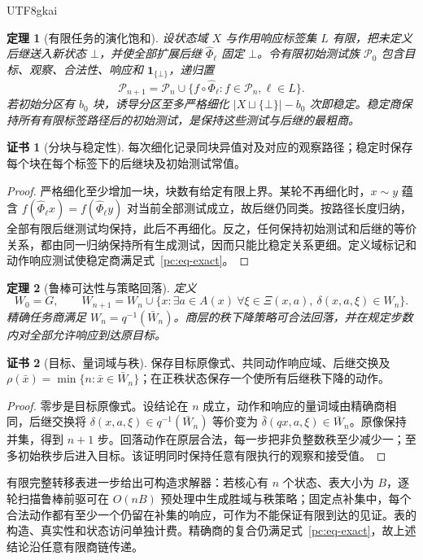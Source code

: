 \documentclass[11pt,a4paper]{article}
\theoremstyle{plain}
\newtheorem{theorem}{定理}[section]
\theoremstyle{definition}
\newtheorem*{certificate}{证书}
\theoremstyle{remark}
\begin{document}
\begin{CJK*}{UTF8}{gkai}
\begin{theorem}[有限任务的演化饱和]
\label{pc:saturation}
设状态域 $X$ 与作用响应标签集 $L$ 有限，把未定义后继送入新状态 $\bot$，并使全部扩展后继 $\widehat\Phi_\ell$ 固定 $\bot$。令有限初始测试族 $\mathcal P_0$ 包含目标、观察、合法性、响应和 $\mathbf1_{\{\bot\}}$，递归置
\[
 \mathcal P_{n+1}=\mathcal P_n\cup
 \{f\circ\widehat\Phi_\ell:f\in\mathcal P_n,\ell\in L\}.
\]
若初始分区有 $b_0$ 块，诱导分区至多严格细化 $|X\sqcup\{\bot\}|-b_0$ 次即稳定。稳定商保持所有有限标签路径后的初始测试，是保持这些测试与后继的最粗商。
\end{theorem}
\begin{certificate}[分块与稳定性]
每次细化记录同块异值对及对应的观察路径；稳定时保存每个块在每个标签下的后继块及初始测试常值。
\end{certificate}
\begin{proof}
严格细化至少增加一块，块数有给定有限上界。某轮不再细化时，$x\sim y$ 蕴含 $f(\widehat\Phi_\ell x)=f(\widehat\Phi_\ell y)$ 对当前全部测试成立，故后继仍同类。按路径长度归纳，全部有限后继测试均保持，此后不再细化。反之，任何保持初始测试和后继的等价关系，都由同一归纳保持所有生成测试，因而只能比稳定关系更细。定义域标记和动作响应测试使稳定商满足式~\eqref{pc:eq-exact}。
\end{proof}

\begin{theorem}[鲁棒可达性与策略回落]
\label{pc:reach}
定义
\[
 W_0=G,\qquad
 W_{n+1}=W_n\cup\{x:\exists a\in A(x)\ \forall\xi\in\Xi(x,a),\ 
                         \delta(x,a,\xi)\in W_n\}.
\]
精确任务商满足 $W_n=q^{-1}(\bar W_n)$。商层的秩下降策略可合法回落，并在规定步数内对全部允许响应到达原目标。
\end{theorem}
\begin{certificate}[目标、量词域与秩]
保存目标原像式、共同动作响应域、后继交换及
$\rho(\bar x)=\min\{n:\bar x\in\bar W_n\}$；在正秩状态保存一个使所有后继秩下降的动作。
\end{certificate}
\begin{proof}
零步是目标原像式。设结论在 $n$ 成立，动作和响应的量词域由精确商相同，后继交换将 $\delta(x,a,\xi)\in q^{-1}(\bar W_n)$ 等价变为 $\bar\delta(qx,a,\xi)\in\bar W_n$。原像保持并集，得到 $n+1$ 步。回落动作在原层合法，每一步把非负整数秩至少减少一；至多初始秩步后进入目标。该证明同时保持任意有限执行的观察和接受值。
\end{proof}

有限完整转移表进一步给出可构造求解器：若核心有 $n$ 个状态、表大小为 $B$，逐轮扫描鲁棒前驱可在 $O(nB)$ 预处理中生成胜域与秩策略；固定点补集中，每个合法动作都有至少一个仍留在补集的响应，可作为不能保证有限到达的见证。表的构造、真实性和状态访问单独计费。精确商的复合仍满足式~\eqref{pc:eq-exact}，故上述结论沿任意有限商链传递。


\end{CJK*}
\end{document}
